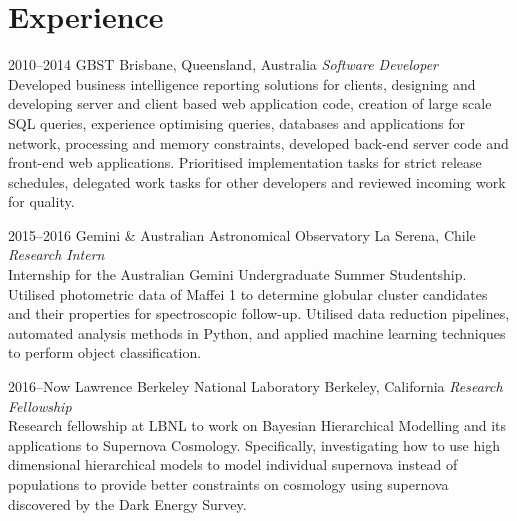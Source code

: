 \documentclass[]{friggeri-cv} %
\begin{document}
\section{Experience}

\begin{entrylist}
\entry
{2010--2014}
{GBST}
{Brisbane, Queensland, Australia}
{\emph{Software Developer} \\
Developed business intelligence reporting solutions for clients, designing and developing server and client based web application code, creation of large scale SQL queries, experience optimising queries, databases and applications for network, processing and memory constraints, developed back-end server code and front-end web applications. Prioritised implementation tasks for strict release schedules, delegated work tasks for other developers and reviewed incoming work for quality.}

\entry
{2015--2016}
{Gemini \& Australian Astronomical Observatory}
{La Serena, Chile}
{\emph{Research Intern} \\
	Internship for the Australian Gemini Undergraduate Summer Studentship. Utilised photometric data of Maffei 1 to determine globular cluster candidates and their properties for spectroscopic follow-up. Utilised data reduction pipelines, automated analysis methods in Python, and applied machine learning techniques to perform object classification.}


\entry
{2016--Now}
{Lawrence Berkeley National Laboratory}
{Berkeley, California}
{\emph{Research Fellowship} \\
	Research fellowship at LBNL to work on Bayesian Hierarchical Modelling and its applications to Supernova Cosmology. Specifically, investigating how to use high dimensional hierarchical models to model individual supernova instead of populations to provide better constraints on cosmology using supernova discovered by the Dark Energy Survey.}


\end{entrylist}
\end{document}
